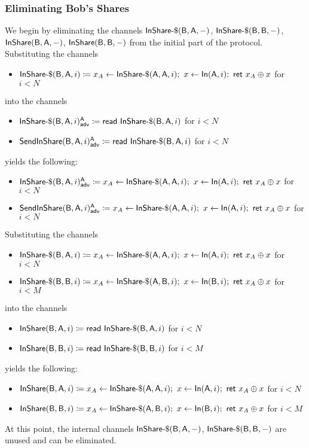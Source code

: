 \subsubsection{Eliminating Bob's Shares}\label{sect:gmw_eliminating_shares}
We begin by eliminating the channels $\InShareGen(\B,\A,-)$, $\InShareGen(\B,\B,-)$, $\InShare(\B,\A,-)$, $\InShare(\B,\B,-)$ from the initial part of the protocol. Substituting the channels
\begin{itemize}
\item $\InShareGen(\B,\A,i) \coloneqq x_A \leftarrow \InShareGen(\A,\A,i); \ x \leftarrow \In(\A,i); \ \ret{x_A \oplus x}$ for $i < N$
\end{itemize}
into the channels
\begin{itemize}
\item {\color{blue} $\LeakInShareGen(\B,\A,i)^\A_\adv \coloneqq \read{\InShareGen(\B,\A,i)}$ for $i < N$}
\item {\color{blue} $\LeakSendInShare(\B,\A,i)^\A_\adv \coloneqq \read{\InShareGen(\B,\A,i)}$ for $i < N$}
\end{itemize}
yields the following:
\begin{itemize}
\item {\color{blue} $\LeakInShareGen(\B,\A,i)^\A_\adv \coloneqq x_A \leftarrow \InShareGen(\A,\A,i); \ x \leftarrow \In(\A,i); \ \ret{x_A \oplus x}$ for $i < N$}
\item {\color{blue} $\LeakSendInShare(\B,\A,i)^\A_\adv \coloneqq x_A \leftarrow \InShareGen(\A,\A,i); \ x \leftarrow \In(\A,i); \ \ret{x_A \oplus x}$ for $i < N$}
\end{itemize}
Substituting the channels
\begin{itemize}
\item $\InShareGen(\B,\A,i) \coloneqq x_A \leftarrow \InShareGen(\A,\A,i); \ x \leftarrow \In(\A,i); \ \ret{x_A \oplus x}$ for $i < N$
\item $\InShareGen(\B,\B,i) \coloneqq x_A \leftarrow \InShareGen(\A,\B,i); \ x \leftarrow \In(\B,i); \ \ret{x_A \oplus x}$ for $i < M$
\end{itemize}
into the channels
\begin{itemize}
\item $\InShare(\B,\A,i) \coloneqq \read{\InShareGen(\B,\A,i)}$ for $i < N$
\item $\InShare(\B,\B,i) \coloneqq \read{\InShareGen(\B,\B,i)}$ for $i < M$
\end{itemize}
yields the following:
\begin{itemize}
\item $\InShare(\B,\A,i) \coloneqq x_A \leftarrow \InShareGen(\A,\A,i); \ x \leftarrow \In(\A,i); \ \ret{x_A \oplus x}$ for $i < N$
\item $\InShare(\B,\B,i) \coloneqq x_A \leftarrow \InShareGen(\A,\B,i); \ x \leftarrow \In(\B,i); \ \ret{x_A \oplus x}$ for $i < M$
\end{itemize}
At this point, the internal channels $\InShareGen(\B,\A,-)$, $\InShareGen(\B,\B,-)$ are unused and can be eliminated.\smallskip

